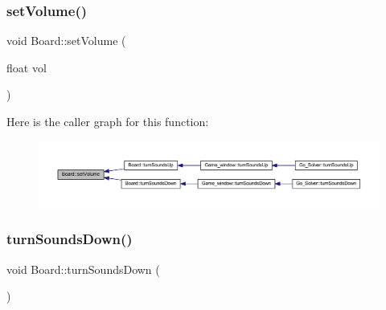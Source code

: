 \subsubsection{\texorpdfstring{set\+Volume()}{setVolume()}}
{\footnotesize\ttfamily void Board\+::set\+Volume (\begin{DoxyParamCaption}\item[{float}]{vol }\end{DoxyParamCaption})}

Here is the caller graph for this function\+:
\nopagebreak
\begin{figure}[H]
\begin{center}
\leavevmode
\includegraphics[width=350pt]{class_board_a4450fe85fda29736cd835fed63d40a41_icgraph}
\end{center}
\end{figure}
\mbox{\label{class_board_a648552cb139f9c0cc61f6372251739b2}} 
\subsubsection{\texorpdfstring{turn\+Sounds\+Down()}{turnSoundsDown()}}
{\footnotesize\ttfamily void Board\+::turn\+Sounds\+Down (\begin{DoxyParamCaption}{ }\end{DoxyParamCaption})}

